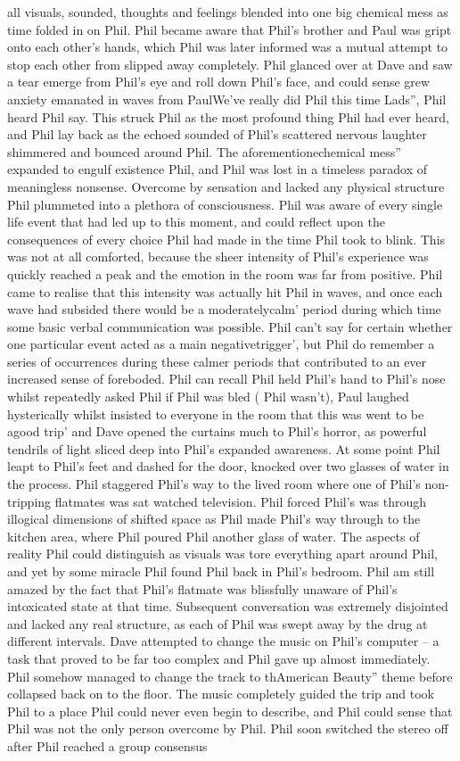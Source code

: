 \documentclass[12pt]{book}
\begin{document}
all visuals, sounded, thoughts and feelings blended into one big chemical mess as time folded in on Phil. Phil became aware that Phil's brother and Paul was gript onto each other's hands, which Phil was later informed was a mutual attempt to stop each other from slipped away completely. Phil glanced over at Dave and saw a tear emerge from Phil's eye and roll down Phil's face, and could sense grew anxiety emanated in waves from PaulWe've really did Phil this time Lads'', Phil heard Phil say. This struck Phil as the most profound thing Phil had ever heard, and Phil lay back as the echoed sounded of Phil's scattered nervous laughter shimmered and bounced around Phil. The aforementionechemical mess'' expanded to engulf existence Phil, and Phil was lost in a timeless paradox of meaningless nonsense. Overcome by sensation and lacked any physical structure Phil plummeted into a plethora of consciousness. Phil was aware of every single life event that had led up to this moment, and could reflect upon the consequences of every choice Phil had made in the time Phil took to blink. This was not at all comforted, because the sheer intensity of Phil's experience was quickly reached a peak and the emotion in the room was far from positive. Phil came to realise that this intensity was actually hit Phil in waves, and once each wave had subsided there would be a moderatelycalm' period during which time some basic verbal communication was possible. Phil can't say for certain whether one particular event acted as a main negativetrigger', but Phil do remember a series of occurrences during these calmer periods that contributed to an ever increased sense of foreboded. Phil can recall Phil held Phil's hand to Phil's nose whilst repeatedly asked Phil if Phil was bled ( Phil wasn't), Paul laughed hysterically whilst insisted to everyone in the room that this was went to be agood trip' and Dave opened the curtains much to Phil's horror, as powerful tendrils of light sliced deep into Phil's expanded awareness. At some point Phil leapt to Phil's feet and dashed for the door, knocked over two glasses of water in the process. Phil staggered Phil's way to the lived room where one of Phil's non-tripping flatmates was sat watched television. Phil forced Phil's was through illogical dimensions of shifted space as Phil made Phil's way through to the kitchen area, where Phil poured Phil another glass of water. The aspects of reality Phil could distinguish as visuals was tore everything apart around Phil, and yet by some miracle Phil found Phil back in Phil's bedroom. Phil am still amazed by the fact that Phil's flatmate was blissfully unaware of Phil's intoxicated state at that time. Subsequent conversation was extremely disjointed and lacked any real structure, as each of Phil was swept away by the drug at different intervals. Dave attempted to change the music on Phil's computer -- a task that proved to be far too complex and Phil gave up almost immediately. Phil somehow managed to change the track to thAmerican Beauty'' theme before collapsed back on to the floor. The music completely guided the trip and took Phil to a place Phil could never even begin to describe, and Phil could sense that Phil was not the only person overcome by Phil. Phil soon switched the stereo off after Phil reached a group consensus 
\end{document}
